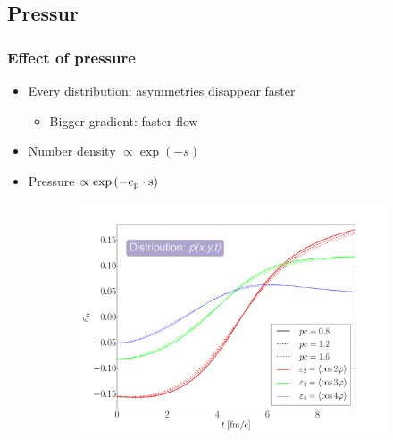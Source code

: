 \documentclass{beamer}
\begin{document}
\begin{frame}
\begin{center}
\begin{figure}[H]
\begin{subfigure}[b]{0.49\textwidth}
	\end{subfigure}
\end{figure}
\end{center}
\end{frame}

\subsection{Pressur}
\begin{frame}
\frametitle{Effect of pressure}
\begin{center}
\begin{itemize}
\setlength{\itemsep}{12pt}
\item<1-> Every distribution: asymmetries disappear faster
\begin{itemize}
\vspace{8pt}
\item<1-> Bigger gradient: faster flow
\end{itemize}
\item<1-> Number density $\propto \exp{(-s)}$
\item<1-> Pressure $\propto \exp{(-\rm{c_p}\cdot s)}$
\end{itemize}
\begin{figure}[H]
	\centering
    \begin{subfigure}[b]{0.49\textwidth}
    		\includegraphics[width=\textwidth]{pic/res/rel/eps_pgrad_p.pdf}
	\end{subfigure}
	\begin{subfigure}[b]{0.49\textwidth}

\end{subfigure}
\end{figure}
\end{center}
\end{frame}
\end{document}
